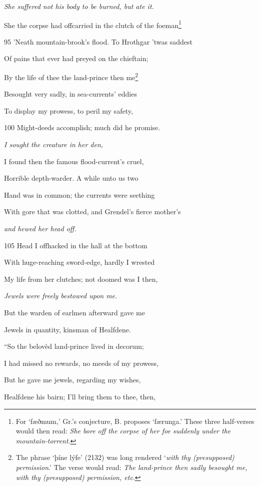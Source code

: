 \emph{She suffered not
his body to be
burned, but ate it.}

She the corpse had offcarried in the clutch of the foeman\footnote{For ‘fæðmum,’ Gr.’s conjecture, B. proposes ‘færunga.’ These three
half-verses would then read: \emph{She bore off the corpse of her foe suddenly under
the mountain-torrent}.}

95
’Neath mountain-brook’s flood. To Hrothgar ’twas saddest

Of pains that ever had preyed on the chieftain;

By the life of thee the land-prince then me\footnote{The phrase ‘þíne lýfe’ (2132) was long rendered ‘\emph{with thy (presupposed)
permission}.’ The verse would read: \emph{The land-prince then sadly besought me,
with thy (presupposed) permission, etc}.}

Besought very sadly, in sea-currents’ eddies

To display my prowess, to peril my safety,

100
Might-deeds accomplish; much did he promise.

\emph{I sought the creature
in her den,}

I found then the famous flood-current’s cruel,

Horrible depth-warder. A while unto us two

Hand was in common; the currents were seething

With gore that was clotted, and Grendel’s fierce mother’s

\emph{and hewed her
head off.}

105
Head I offhacked in the hall at the bottom

With huge-reaching sword-edge, hardly I wrested

My life from her clutches; not doomed was I then,

\emph{Jewels were freely
bestowed upon me.}

But the warden of earlmen afterward gave me

Jewels in quantity, kinsman of Healfdene.



“So the belovèd land-prince lived in decorum;

I had missed no rewards, no meeds of my prowess,

But he gave me jewels, regarding my wishes,

Healfdene his bairn; I’ll bring them to thee, then,

